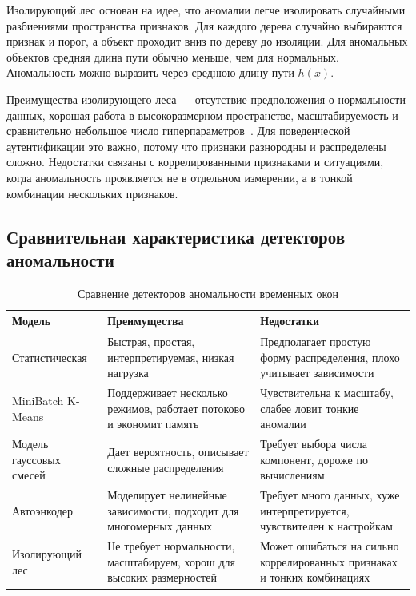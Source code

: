 \documentclass[oneside,senior,etd]{BYUPhys}
\begin{document}
Изолирующий лес основан на идее, что аномалии легче изолировать случайными разбиениями пространства признаков. Для каждого дерева случайно выбираются признак и порог, а объект проходит вниз по дереву до изоляции. Для аномальных объектов средняя длина пути обычно меньше, чем для нормальных. Аномальность можно выразить через среднюю длину пути $h(x)$.

Преимущества изолирующего леса --- отсутствие предположения о нормальности данных, хорошая работа в высокоразмерном пространстве, масштабируемость и сравнительно небольшое число гиперпараметров~\cite{liu2008isolation}. Для поведенческой аутентификации это важно, потому что признаки разнородны и распределены сложно. Недостатки связаны с коррелированными признаками и ситуациями, когда аномальность проявляется не в отдельном измерении, а в тонкой комбинации нескольких признаков.

\subsection{Сравнительная характеристика детекторов аномальности}

\begin{table}[ht]
\centering
\caption{Сравнение детекторов аномальности временных окон}
\label{tab:anomaly-comparison}
\begin{tabular}{|p{}|p{}|p{}|}
\hline
\textbf{Модель} & \textbf{Преимущества} & \textbf{Недостатки} \\
\hline
Статистическая & Быстрая, простая, интерпретируемая, низкая нагрузка & Предполагает простую форму распределения, плохо учитывает зависимости \\
\hline
MiniBatch K-Means & Поддерживает несколько режимов, работает потоково и экономит память & Чувствительна к масштабу, слабее ловит тонкие аномалии \\
\hline
Модель гауссовых смесей & Дает вероятность, описывает сложные распределения & Требует выбора числа компонент, дороже по вычислениям \\
\hline
Автоэнкодер & Моделирует нелинейные зависимости, подходит для многомерных данных & Требует много данных, хуже интерпретируется, чувствителен к настройкам \\
\hline
Изолирующий лес & Не требует нормальности, масштабируем, хорош для высоких размерностей & Может ошибаться на сильно коррелированных признаках и тонких комбинациях \\
\hline
\end{tabular}
\end{table}
\end{document}

